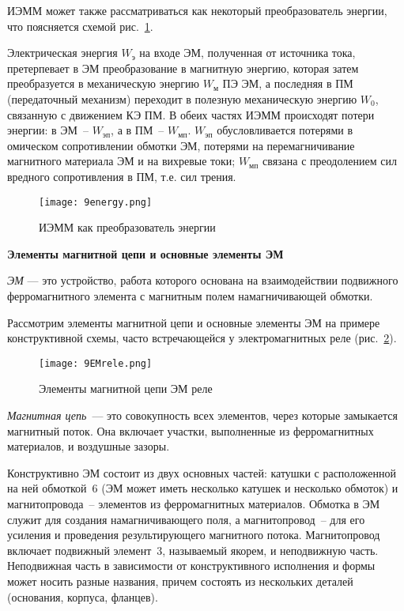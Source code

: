 ИЭММ может также рассматриваться как некоторый преобразователь энергии, что поясняется схемой рис.~\ref{pic:9energy}. 

Электрическая энергия $ W_\text{э} $ на входе ЭМ, полученная от источника тока, претерпевает в ЭМ преобразование в магнитную энергию, которая затем преобразуется в механическую энергию $ W_\text{м} $ ПЭ ЭМ, а последняя в ПМ (передаточный механизм) переходит в полезную механическую энергию $ W_0 $, связанную с движением КЭ ПМ. В обеих частях ИЭММ происходят потери энергии: в ЭМ~-- $ W_\text{эп} $, а в ПМ~-- $ W_\text{мп} $. $ W_\text{эп} $ обусловливается потерями в омическом сопротивлении обмотки ЭМ, потерями на перемагничивание магнитного материала ЭМ и на вихревые токи; $ W_\text{мп} $ связана с преодолением сил вредного сопротивления в ПМ, т.е. сил трения.

\begin{figure}[h!]
	\caption{ ИЭММ как преобразователь энергии}
	\texttt{[image: 9energy.png]}
	\label{pic:9energy}
\end{figure}

\begin{flushleft}
\textbf{Элементы магнитной цепи и основные элементы ЭМ}
\end{flushleft}

\textit{ЭМ} --- это устройство, работа которого основана на взаимодействии подвижного ферромагнитного элемента с магнитным полем намагничивающей обмотки.

Рассмотрим элементы магнитной цепи и основные элементы ЭМ на примере конструктивной схемы, часто встречающейся у электромагнитных реле (рис.~\ref{pic:9EMrele}).

\begin{figure}[h!]
	\caption{ Элементы магнитной цепи ЭМ реле}
	\texttt{[image: 9EMrele.png]}
	\label{pic:9EMrele}
\end{figure}

\textit{Магнитная цепь}~--- это совокупность всех элементов, через которые замыкается магнитный поток. Она включает участки, выполненные из ферромагнитных материалов, и воздушные зазоры.

Конструктивно ЭМ состоит из двух основных частей: катушки с расположенной на ней обмоткой~6 (ЭМ может иметь несколько катушек и несколько обмоток) и магнитопровода~-- элементов из ферромагнитных материалов. Обмотка в ЭМ служит для создания намагничивающего поля, а магнитопровод~-- для его усиления и проведения результирующего магнитного потока. Магнитопровод включает подвижный элемент~3, называемый якорем, и неподвижную часть. Неподвижная часть в зависимости от конструктивного исполнения и формы может носить разные названия, причем состоять из нескольких деталей (основания, корпуса, фланцев).

